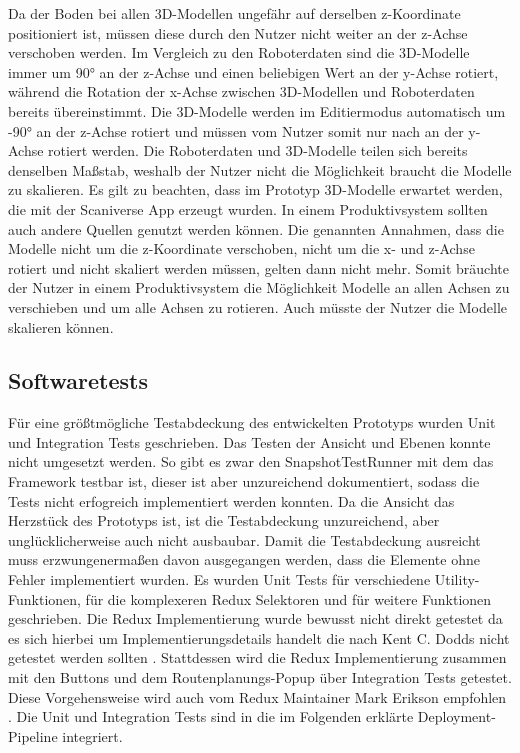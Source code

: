Da der Boden bei allen 3D-Modellen ungefähr auf derselben z-Koordinate positioniert ist, müssen diese durch den Nutzer nicht weiter an der z-Achse verschoben werden. Im Vergleich zu den Roboterdaten sind die 3D-Modelle immer um 90° an der z-Achse und einen beliebigen Wert an der y-Achse rotiert, während die Rotation der x-Achse zwischen 3D-Modellen und Roboterdaten bereits übereinstimmt. Die 3D-Modelle werden im Editiermodus automatisch um -90° an der z-Achse rotiert und müssen vom Nutzer somit nur nach an der y-Achse rotiert werden. Die Roboterdaten und 3D-Modelle teilen sich bereits denselben Maßstab, weshalb der Nutzer nicht die Möglichkeit braucht die Modelle zu skalieren. Es gilt zu beachten, dass im Prototyp 3D-Modelle erwartet werden, die mit der Scaniverse App erzeugt wurden. In einem Produktivsystem sollten auch andere Quellen genutzt werden können. Die genannten Annahmen, dass die Modelle nicht um die z-Koordinate verschoben, nicht um die x- und z-Achse rotiert und nicht skaliert werden müssen, gelten dann nicht mehr. Somit bräuchte der Nutzer in einem Produktivsystem die Möglichkeit Modelle an allen Achsen zu verschieben und um alle Achsen zu rotieren. Auch müsste der Nutzer die Modelle skalieren können.

\subsection{Softwaretests}
Für eine größtmögliche Testabdeckung des entwickelten Prototyps wurden Unit und Integration Tests geschrieben. Das Testen der \deckgl{} Ansicht und Ebenen konnte nicht umgesetzt werden. So gibt es zwar den SnapshotTestRunner \cite{DeckglSnapshotTestRunner} mit dem das Framework testbar ist, dieser ist aber unzureichend dokumentiert, sodass die Tests nicht erfogreich implementiert werden konnten. Da die \deckgl{} Ansicht das Herzstück des Prototyps ist, ist die Testabdeckung unzureichend, aber unglücklicherweise auch nicht ausbaubar. Damit die Testabdeckung ausreicht muss erzwungenermaßen davon ausgegangen werden, dass die \deckgl{} Elemente ohne Fehler implementiert wurden. Es wurden Unit Tests für verschiedene Utility-Funktionen, für die komplexeren Redux Selektoren und für weitere Funktionen geschrieben. Die Redux Implementierung wurde bewusst nicht direkt getestet da es sich hierbei um Implementierungsdetails handelt die nach Kent C. Dodds nicht getestet werden sollten \cite{Dodds}. Stattdessen wird die Redux Implementierung zusammen mit den Buttons und dem Routenplanungs-Popup über Integration Tests getestet. Diese Vorgehensweise wird auch vom Redux Maintainer Mark Erikson empfohlen \cite{Erikson}. Die Unit und Integration Tests sind in die im Folgenden erklärte Deployment-Pipeline integriert.

